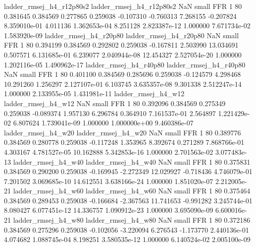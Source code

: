 ladder_rmsej_h4_r12p80s2 ladder_rmsej_h4_r12p80s2                   NaN      small      FFR                 1 80 0.381645       0.384569 0.277865       0.259038   -0.107310     -0.760313      7.268155    -0.207824   8.359010e-01  4.011136 1.362653e-04     8.251128   2.823387e-12            1.000000    7.671734e-02        1.583920e-09
  ladder_rmsej_h4_r20p80   ladder_rmsej_h4_r20p80                   NaN      small      FFR                 1 80 0.394199       0.384569 0.292802       0.259038   -0.167811      2.503990     13.034691     0.507571   6.131685e-01  6.239077 2.040944e-08    12.454327   2.527054e-20            1.000000    1.202116e-05        1.490962e-17
  ladder_rmsej_h4_r40p80   ladder_rmsej_h4_r40p80                   NaN      small      FFR                 1 80 0.401100       0.384569 0.285696       0.259038   -0.124579      4.298468     10.291260     1.256297   2.127107e-01  6.103745 3.635357e-08     9.301338   2.512247e-14            1.000000    2.133955e-05        1.431981e-11
     ladder_rmsej_h4_w12      ladder_rmsej_h4_w12                   NaN      small      FFR                 1 80 0.392096       0.384569 0.275349       0.259038   -0.089374      1.957130      6.296784     0.364910   7.161537e-01  2.564897 1.221429e-02     6.807624   1.739041e-09            1.000000    1.000000e+00        9.460386e-07
     ladder_rmsej_h4_w20      ladder_rmsej_h4_w20                   NaN      small      FFR                 1 80 0.389776       0.384569 0.280778       0.259038   -0.117248      1.353965      8.392674     0.271289   7.868766e-01  4.303167 4.781527e-05    10.162888   5.342853e-16            1.000000    2.701563e-02        3.077483e-13
     ladder_rmsej_h4_w40      ladder_rmsej_h4_w40                   NaN      small      FFR                 1 80 0.375831       0.384569 0.290200       0.259038   -0.169945     -2.272349     12.029927    -0.718436   4.746079e-01  7.201502 3.069685e-10    14.612551   3.638166e-24            1.000000    1.851020e-07        2.212005e-21
     ladder_rmsej_h4_w60      ladder_rmsej_h4_w60                   NaN      small      FFR                 1 80 0.375464       0.384569 0.289453       0.259038   -0.166684     -2.367563     11.741653    -0.991282   3.245744e-01  8.080427 6.077451e-12    14.336757   1.090912e-23            1.000000    3.695090e-09        6.600016e-21
     ladder_rmsej_h4_w80      ladder_rmsej_h4_w80                   NaN      small      FFR                 1 80 0.372186       0.384569 0.275296       0.259038   -0.102056     -3.220094      6.276543    -1.173770   2.440136e-01  4.074682 1.088745e-04     8.198251   3.580535e-12            1.000000    6.140524e-02        2.005100e-09

